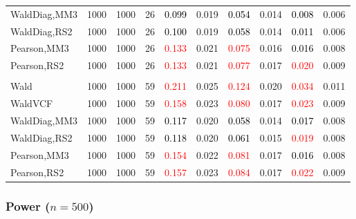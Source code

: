 \documentclass[
]{article}
\begin{document}
\begin{table}[H]
{\begin{tabular}[t]{lrrrrrrlrr}
\hspace{1em}WaldDiag,MM3 & 1000 & 1000 & 26 & \textcolor{black}{0.099} & 0.019 & \textcolor{black}{0.054} & 0.014 & \textcolor{black}{0.008} & 0.006\\
\hspace{1em}WaldDiag,RS2 & 1000 & 1000 & 26 & \textcolor{black}{0.100} & 0.019 & \textcolor{black}{0.058} & 0.014 & \textcolor{black}{0.011} & 0.006\\
\hspace{1em}Pearson,MM3 & 1000 & 1000 & 26 & \textcolor{red}{0.133} & 0.021 & \textcolor{red}{0.075} & 0.016 & \textcolor{black}{0.016} & 0.008\\
\hspace{1em}Pearson,RS2 & 1000 & 1000 & 26 & \textcolor{red}{0.133} & 0.021 & \textcolor{red}{0.077} & 0.017 & \textcolor{red}{0.020} & 0.009\\
\addlinespace[0.3em]
\multicolumn{10}{l}{\textbf{3F 15V}}\\
\hspace{1em}Wald & 1000 & 1000 & 59 & \textcolor{red}{0.211} & 0.025 & \textcolor{red}{0.124} & 0.020 & \textcolor{red}{0.034} & 0.011\\
\hspace{1em}WaldVCF & 1000 & 1000 & 59 & \textcolor{red}{0.158} & 0.023 & \textcolor{red}{0.080} & 0.017 & \textcolor{red}{0.023} & 0.009\\
\hspace{1em}WaldDiag,MM3 & 1000 & 1000 & 59 & \textcolor{black}{0.117} & 0.020 & \textcolor{black}{0.058} & 0.014 & \textcolor{black}{0.017} & 0.008\\
\hspace{1em}WaldDiag,RS2 & 1000 & 1000 & 59 & \textcolor{black}{0.118} & 0.020 & \textcolor{black}{0.061} & 0.015 & \textcolor{red}{0.019} & 0.008\\
\hspace{1em}Pearson,MM3 & 1000 & 1000 & 59 & \textcolor{red}{0.154} & 0.022 & \textcolor{red}{0.081} & 0.017 & \textcolor{black}{0.016} & 0.008\\
\hspace{1em}Pearson,RS2 & 1000 & 1000 & 59 & \textcolor{red}{0.157} & 0.023 & \textcolor{red}{0.084} & 0.017 & \textcolor{red}{0.022} & 0.009\\
\bottomrule
\end{tabular}}
\endgroup{}
\end{table}

\hypertarget{power-n500-3}{%
\subsubsection{\texorpdfstring{Power
(\(n=500\))}{Power (n=500)}}\label{power-n500-3}}
\end{document}
